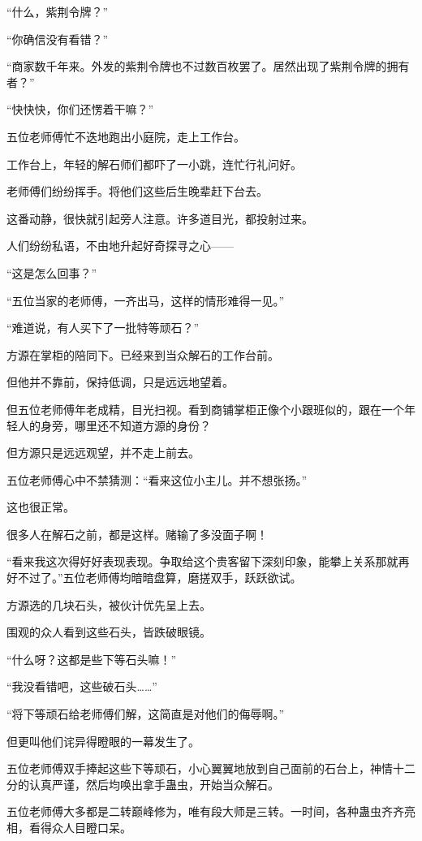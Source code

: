 \begin{this_body}
“什么，紫荆令牌？”

“你确信没有看错？”

“商家数千年来。外发的紫荆令牌也不过数百枚罢了。居然出现了紫荆令牌的拥有者？”

“快快快，你们还愣着干嘛？”

五位老师傅忙不迭地跑出小庭院，走上工作台。

工作台上，年轻的解石师们都吓了一小跳，连忙行礼问好。

老师傅们纷纷挥手。将他们这些后生晚辈赶下台去。

这番动静，很快就引起旁人注意。许多道目光，都投射过来。

人们纷纷私语，不由地升起好奇探寻之心——

“这是怎么回事？”

“五位当家的老师傅，一齐出马，这样的情形难得一见。”

“难道说，有人买下了一批特等顽石？”

方源在掌柜的陪同下。已经来到当众解石的工作台前。

但他并不靠前，保持低调，只是远远地望着。

但五位老师傅年老成精，目光扫视。看到商铺掌柜正像个小跟班似的，跟在一个年轻人的身旁，哪里还不知道方源的身份？

但方源只是远远观望，并不走上前去。

五位老师傅心中不禁猜测：“看来这位小主儿。并不想张扬。”

这也很正常。

很多人在解石之前，都是这样。赌输了多没面子啊！

“看来我这次得好好表现表现。争取给这个贵客留下深刻印象，能攀上关系那就再好不过了。”五位老师傅均暗暗盘算，磨搓双手，跃跃欲试。

方源选的几块石头，被伙计优先呈上去。

围观的众人看到这些石头，皆跌破眼镜。

“什么呀？这都是些下等石头嘛！”

“我没看错吧，这些破石头……”

“将下等顽石给老师傅们解，这简直是对他们的侮辱啊。”

但更叫他们诧异得瞪眼的一幕发生了。

五位老师傅双手捧起这些下等顽石，小心翼翼地放到自己面前的石台上，神情十二分的认真严谨，然后均唤出拿手蛊虫，开始当众解石。

五位老师傅大多都是二转巅峰修为，唯有段大师是三转。一时间，各种蛊虫齐齐亮相，看得众人目瞪口呆。


\end{this_body}
